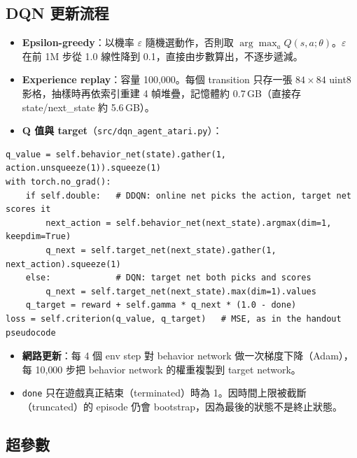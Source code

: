 \documentclass[11pt,a4paper]{article}
\begin{document}
\subsection{DQN 更新流程}

\begin{itemize}
  \item \textbf{Epsilon-greedy}：以機率 $\varepsilon$ 隨機選動作，否則取 $\arg\max_a Q(s,a;\theta)$。$\varepsilon$ 在前 1M 步從 1.0 線性降到 0.1，直接由步數算出，不逐步遞減。
  \item \textbf{Experience replay}：容量 100{,}000。每個 transition 只存一張 $84\times84$ uint8 影格，抽樣時再依索引重建 4 幀堆疊，記憶體約 0.7\,GB（直接存 state/next\_state 約 5.6\,GB）。
  \item \textbf{Q 值與 target}（\texttt{src/dqn\_agent\_atari.py}）：
\end{itemize}

\noindent\begin{minipage}{\linewidth}
\begin{lstlisting}
q_value = self.behavior_net(state).gather(1, action.unsqueeze(1)).squeeze(1)
with torch.no_grad():
    if self.double:   # DDQN: online net picks the action, target net scores it
        next_action = self.behavior_net(next_state).argmax(dim=1, keepdim=True)
        q_next = self.target_net(next_state).gather(1, next_action).squeeze(1)
    else:             # DQN: target net both picks and scores
        q_next = self.target_net(next_state).max(dim=1).values
    q_target = reward + self.gamma * q_next * (1.0 - done)
loss = self.criterion(q_value, q_target)   # MSE, as in the handout pseudocode
\end{lstlisting}
\end{minipage}

\begin{itemize}
  \item \textbf{網路更新}：每 4 個 env step 對 behavior network 做一次梯度下降（Adam），每 10{,}000 步把 behavior network 的權重複製到 target network。
  \item \texttt{done} 只在遊戲真正結束（terminated）時為 1。因時間上限被截斷（truncated）的 episode 仍會 bootstrap，因為最後的狀態不是終止狀態。
\end{itemize}

\subsection{超參數}
\end{document}
